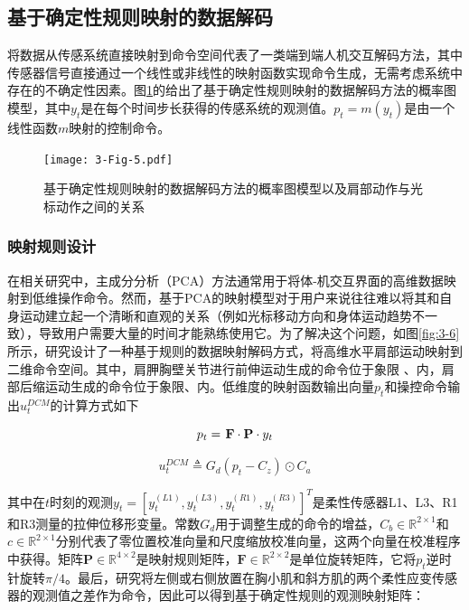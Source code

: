 \subsection{基于确定性规则映射的数据解码}
将数据从传感系统直接映射到命令空间代表了一类端到端人机交互解码方法，其中传感器信号直接通过一个线性或非线性的映射函数实现命令生成，无需考虑系统中存在的不确定性因素。图\ref{fig:3-5}的给出了基于确定性规则映射的数据解码方法的概率图模型，其中${y_t}$是在每个时间步长获得的传感系统的观测值。${{p}_t} = m({{y}_t})$是由一个线性函数$m$映射的控制命令。

\begin{figure}[htb]
    \centering
    \texttt{[image: 3-Fig-5.pdf]}
    \caption{基于确定性规则映射的数据解码方法的概率图模型以及肩部动作与光标动作之间的关系}
    \label{fig:3-5}
\end{figure} 

\subsubsection{映射规则设计}
在相关研究中，主成分分析（PCA）方法通常用于将体-机交互界面的高维数据映射到低维操作命令\cite{casadioBodyMachineInterface2011,seanez-gonzalezStaticDynamicDecoding2017}。然而，基于PCA的映射模型对于用户来说往往难以将其和自身运动建立起一个清晰和直观的关系（例如光标移动方向和身体运动趋势不一致），导致用户需要大量的时间才能熟练使用它。为了解决这个问题，如图\ref{fig:3-6}所示，研究设计了一种基于规则的数据映射解码方式，将高维水平肩部运动映射到二维命令空间。其中，肩胛胸壁关节进行前伸运动生成的命令位于象限 \uppercase\expandafter{}、\uppercase\expandafter{}内，肩部后缩运动生成的命令位于象限\uppercase\expandafter{}、\uppercase\expandafter{}内。低维度的映射函数输出向量${p_t}$和操控命令输出$u_t^{DCM}$的计算方式如下

\begin{equation}
{p_t} = {\kern 1pt} \mathbf{{F}} \cdot \mathbf{{P}} \cdot {y_t}
\label{eq1}
\end{equation}   

\begin{equation}
\label{eq2}
u_t^{DCM} \triangleq {G_d}\left( {{p_t} - C_z} \right) \odot C_a
\end{equation}   

其中在$t$时刻的观测${y_t} = {[y_t^{(L1)},y_t^{(L3)},y_t^{(R1)},y_t^{(R3)}]^T}$是柔性传感器L1、L3、R1和R3测量的拉伸位移形变量。常数${G_d}$用于调整生成的命令的增益，$C_b\in {\mathbb{R}^{2 \times 1}}$和$c \in {\mathbb{R}^{2 \times 1}}$分别代表了零位置校准向量和尺度缩放校准向量，这两个向量在校准程序中获得。矩阵$\mathbf{P} \in {\mathbb{R}^{4 \times 2}}$是映射规则矩阵，$\mathbf{F} \in {\mathbb{R}^{2 \times 2}}$是单位旋转矩阵，它将$p_t$逆时针旋转$\pi /4$。最后，研究将左侧或右侧放置在胸小肌和斜方肌的两个柔性应变传感器的观测值之差作为命令，因此可以得到基于确定性规则的观测映射矩阵：


